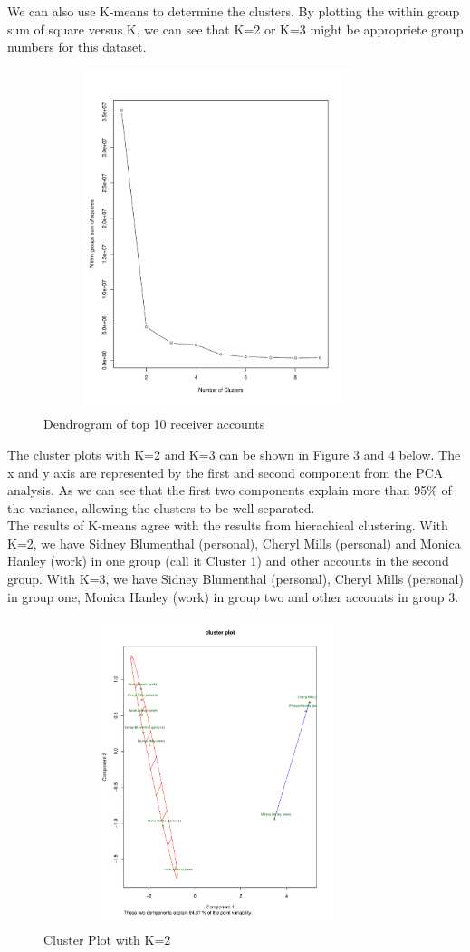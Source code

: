 We can also use K-means to determine the clusters. By plotting the within group sum of square versus K, we can see that K=2 or K=3 might be appropriete group numbers for this dataset.
\begin{figure}[h!]
    \centering
    \includegraphics[width=10cm,height=10cm]
    {clusterd.pdf}
    \caption{Dendrogram of top 10 receiver accounts}
\end{figure}


The cluster plots with K=2 and K=3 can be shown in Figure 3 and 4 below. The x and y axis are represented by the first and second component from the PCA analysis. As we can see that the first two components explain more than 95\% of the variance, allowing the clusters to be well separated. 
\\
The results of K-means agree with the results from hierachical clustering. With K=2, we have Sidney Blumenthal (personal), Cheryl Mills (personal) and Monica Hanley (work) in one group (call it Cluster 1) and other accounts in the second group. With K=3, we have Sidney Blumenthal (personal), Cheryl Mills (personal) in group one, Monica Hanley (work) in group two and other accounts in group 3.

\begin{figure}[h!]
    \centering
    \includegraphics[width=10cm,height=9cm]
    {c2.pdf}
    \caption{Cluster Plot with K=2}
\end{figure}

